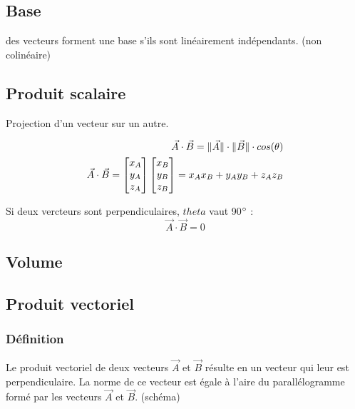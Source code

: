 \documentclass[12pt,a4paper,twoside]{article}
\numberwithin{equation}{subsection}
\DeclarePairedDelimiter{\norm}{\lVert}{\rVert}
\begin{document}
\subsection{Base}
des vecteurs forment une base s'ils sont linéairement indépendants. (non colinéaire)

\subsection{Produit scalaire}
Projection d'un vecteur sur un autre.

\begin{eqnarray}
\vec{A} \cdot \vec{B}=\norm{\vec{A}} \cdot \norm{\vec{B}} \cdot cos(\theta)\\
\vec{A} \cdot \vec{B}= 
\begin{bmatrix}
x_A \\
y_A\\
z_A
\end{bmatrix}
\begin{bmatrix}
x_B \\
y_B\\
z_B
\end{bmatrix}
=x_A x_B + y_A y_B + z_A z_B
\end{eqnarray}

Si deux vercteurs sont perpendiculaires, $theta$ vaut 90$\degree$ :
\begin{equation}
\vec{A} \cdot \vec{B}=0
\end{equation}

\subsection{Volume}

\subsection{Produit vectoriel}

\subsubsection{Définition}
Le produit vectoriel de deux vecteurs $\vec{A}$ et $\vec{B}$ résulte en un vecteur qui leur est perpendiculaire. La norme de ce vecteur est égale à l'aire du parallélogramme formé par les vecteurs $\vec{A}$ et $\vec{B}$. (schéma)
\end{document}
